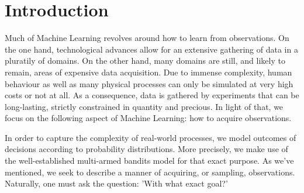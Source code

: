 \newcommand{\package}{\emph}

\chapter{Introduction}



Much of Machine Learning revolves around how to learn from observations. On the one hand, technological advances allow for an extensive gathering of data in a pluratily of domains. On the other hand, many domains are still, and likely to remain, areas of expensive data acquisition. Due to immense complexity, human behaviour as well as many physical processes can only be simulated at very high costs or not at all. As a consequence, data is gathered by experiments that can be long-lasting, strictly constrained in quantity and precious. In light of that, we focus on the following aspect of Machine Learning: how to acquire observations.

In order to capture the complexity of real-world processes, we model outcomes of decisions according to probability distributions. More precisely, we make use of the well-established multi-armed bandits model for that exact purpose. As we've mentioned, we seek to describe a manner of acquiring, or sampling, observations. Naturally, one must ask the question: 'With what exact goal?'

